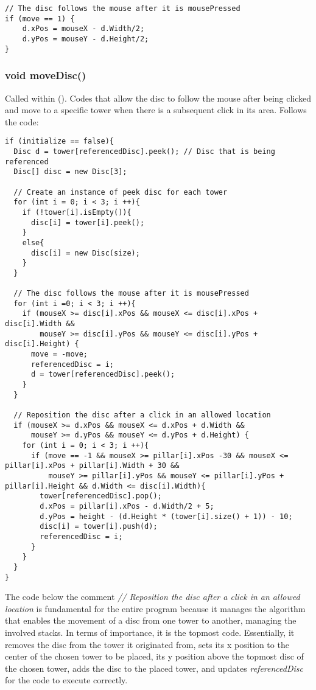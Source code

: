 \documentclass[
	12pt,				%
	oneside,			%
	a4paper,			%
	english,			%
	brazil,				%
	]{abntex2}
\begin{document}
{\begin{itshape}
\begin{verbatim}
// The disc follows the mouse after it is mousePressed
if (move == 1) {
    d.xPos = mouseX - d.Width/2;
    d.yPos = mouseY - d.Height/2;
} 
\end{verbatim}
\end{itshape}

\subsubsection{void moveDisc()}
Called within \mousePressed(). Codes that allow the disc to follow the mouse after being clicked and move to a specific tower when there is a subsequent click in its area. Follows the code:

\begin{itshape}
\begin{verbatim}
if (initialize == false){
  Disc d = tower[referencedDisc].peek(); // Disc that is being referenced
  Disc[] disc = new Disc[3];

  // Create an instance of peek disc for each tower
  for (int i = 0; i < 3; i ++){
    if (!tower[i].isEmpty()){
      disc[i] = tower[i].peek();
    }
    else{
      disc[i] = new Disc(size);
    }
  }

  // The disc follows the mouse after it is mousePressed
  for (int i =0; i < 3; i ++){
    if (mouseX >= disc[i].xPos && mouseX <= disc[i].xPos + disc[i].Width &&
        mouseY >= disc[i].yPos && mouseY <= disc[i].yPos + disc[i].Height) {
      move = -move;
      referencedDisc = i;
      d = tower[referencedDisc].peek(); 
    }
  }

  // Reposition the disc after a click in an allowed location
  if (mouseX >= d.xPos && mouseX <= d.xPos + d.Width &&
      mouseY >= d.yPos && mouseY <= d.yPos + d.Height) {
    for (int i = 0; i < 3; i ++){
      if (move == -1 && mouseX >= pillar[i].xPos -30 && mouseX <= pillar[i].xPos + pillar[i].Width + 30 &&
          mouseY >= pillar[i].yPos && mouseY <= pillar[i].yPos + pillar[i].Height && d.Width <= disc[i].Width){
        tower[referencedDisc].pop();
        d.xPos = pillar[i].xPos - d.Width/2 + 5;
        d.yPos = height - (d.Height * (tower[i].size() + 1)) - 10;  
        disc[i] = tower[i].push(d); 
        referencedDisc = i;
      }
    }
  }
}
\end{verbatim}
\end{itshape}

The code below the comment \textit{// Reposition the disc after a click in an allowed location} is fundamental for the entire program because it manages the algorithm that enables the movement of a disc from one tower to another, managing the involved stacks. In terms of importance, it is the topmost code. Essentially, it removes the disc from the tower it originated from, sets its x position to the center of the chosen tower to be placed, its y position above the topmost disc of the chosen tower, adds the disc to the placed tower, and updates \textit{referencedDisc} for the code to execute correctly.

}
\end{document}
